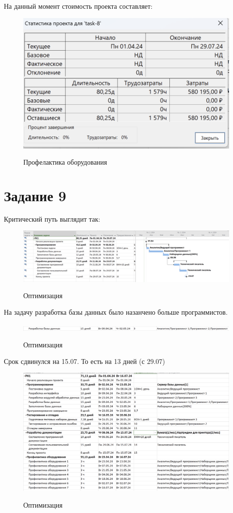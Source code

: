 На данный момент стоимость проекта составляет:

\begin{figure}[ht!]
	\includegraphics[width=0.75\linewidth]{assets/images/8.5-zatrats.png}
	\label{fig:r2}
	\caption{Профелактика оборудования}
\end{figure}
\FloatBarrier

\section{Задание 9}

Критический путь выглядит так:

\begin{figure}[ht!]
	\includegraphics[width=0.75\linewidth]{assets/images/9.1-crit.png}
	\label{fig:r2}
	\caption{Оптимизация}
\end{figure}
\FloatBarrier

На задачу разработка базы данных было назанчено больше программистов.

\begin{figure}[ht!]
	\includegraphics[width=0.75\linewidth]{assets/images/9.2-optimiz.png}
	\label{fig:r2}
	\caption{Оптимизация}
\end{figure}
\FloatBarrier

Срок сдвинулся на 15.07. То есть на 13 дней (с 29.07)

\begin{figure}[ht!]
	\includegraphics[width=0.75\linewidth]{assets/images/9.3-res.png}
	\label{fig:r2}
	\caption{Оптимизация}
\end{figure}
\FloatBarrier

